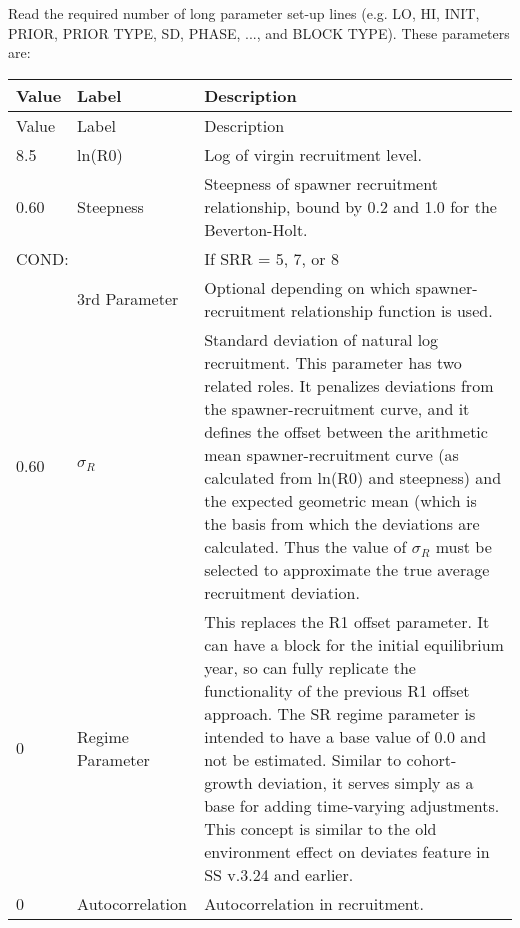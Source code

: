 Read the required number of long parameter set-up lines (e.g. LO, HI, INIT, PRIOR, PRIOR TYPE, SD, PHASE, ..., and BLOCK TYPE).  These parameters are:
\begin{longtable}{p{1cm} p{3cm} p{11cm}}
	\hline
	Value & Label &  Description\Tstrut\Bstrut\\
	\hline
	\endfirsthead

	\hline
	Value & Label &  Description\Tstrut\Bstrut\\
	\hline
	\endhead
	\hline
	\endfoot
	\endlastfoot

	8.5 & ln(R0) & Log of virgin recruitment level. \Tstrut\Bstrut\\
	\hline

	0.60 \Tstrut & Steepness  & Steepness of spawner recruitment relationship, bound by 0.2 and 1.0 for the Beverton-Holt.\Bstrut\\

	\multicolumn{2}{l}{COND:} \Tstrut & If SRR = 5, 7, or 8\\
	& 3rd Parameter & Optional depending on which spawner-recruitment relationship function is used.\Bstrut\\
	\hline

	0.60 \Tstrut & $\sigma_R$ &  Standard deviation of natural log recruitment. This parameter has two related roles.  It penalizes deviations from the spawner-recruitment curve, and it defines the offset between the arithmetic mean spawner-recruitment curve (as calculated from ln(R0) and steepness) and the expected geometric mean (which is the basis from which the deviations are calculated. Thus the value of $\sigma_R$ must be selected to approximate the true average recruitment deviation.\Bstrut\\

	0\Tstrut & Regime Parameter & This replaces the R1 offset parameter. It can have a block for the initial equilibrium year, so can fully replicate the functionality of the previous R1 offset approach. The SR regime parameter is intended to have a base value of 0.0 and not be estimated. Similar to cohort-growth deviation, it serves simply as a base for adding time-varying adjustments. This concept is similar to the old environment effect on deviates feature in SS v.3.24 and earlier.\Bstrut\\
	\hline

	0 & Autocorrelation & Autocorrelation in recruitment.\Tstrut\Bstrut\\
	\hline
\end{longtable}


